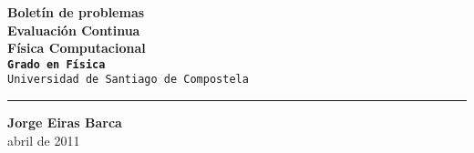 \documentclass[a4paper,20pt]{article}
\begin{document}
\begin{center}

{\Huge \bf Boletín de problemas\\[0.5cm] Evaluación Continua}\\[2cm]  %


{\Large \Large \bf Física Computacional} \\[0.2cm]  %
{\large \tt {\tt \bf Grado en Física}\\  
Universidad de Santiago de Compostela}\\[11cm]


\rule{15cm}{3pt}
\end{center}

\begin{flushright}{
{\Large \Large \bf Jorge Eiras Barca}\\[0.2cm]
{\Large abril de 2011} %
}\end{flushright}
\end{document}
